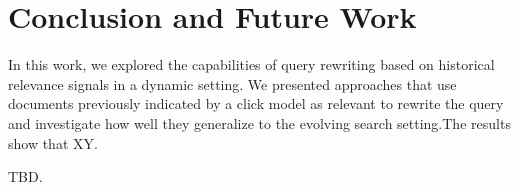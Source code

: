\section{Conclusion and Future Work}
In this work, we explored the capabilities of query rewriting based on historical relevance signals in a dynamic setting. We presented approaches that use documents previously indicated by a click model as relevant to rewrite the query and investigate how well they generalize to the evolving search setting.The results show that XY.



TBD.
